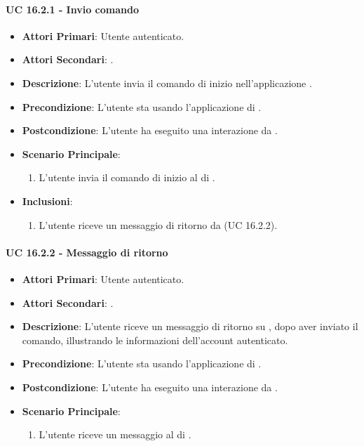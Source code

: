 		\paragraph{UC 16.2.1 - Invio comando}
		\begin{itemize}
			\item \textbf{Attori Primari}: Utente autenticato.
			\item \textbf{Attori Secondari}: .
			\item \textbf{Descrizione}: L'utente invia il comando di inizio nell'applicazione .
			\item \textbf{Precondizione}: L'utente sta usando l'applicazione di .
			\item \textbf{Postcondizione}: L'utente ha eseguito una interazione da .
			\item \textbf{Scenario Principale}:
			\begin{enumerate}
				\item L'utente invia il comando di inizio al  di .
			\end{enumerate}
			\item \textbf{Inclusioni}:
			\begin{enumerate}
				\item L'utente riceve un messaggio di ritorno da  (UC 16.2.2).
			\end{enumerate}
		\end{itemize}

		\paragraph{UC 16.2.2 - Messaggio di ritorno}
		\begin{itemize}
			\item \textbf{Attori Primari}: Utente autenticato.
			\item \textbf{Attori Secondari}: .
			\item \textbf{Descrizione}: L'utente riceve un messaggio di ritorno su , dopo aver inviato il comando, illustrando le informazioni dell'account autenticato.
			\item \textbf{Precondizione}: L'utente sta usando l'applicazione di .
			\item \textbf{Postcondizione}: L'utente ha eseguito una interazione da .
			\item \textbf{Scenario Principale}:
			\begin{enumerate}
				\item L'utente riceve un messaggio al  di .
			\end{enumerate}
		\end{itemize}



